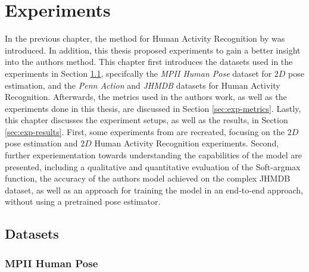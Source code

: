 \chapter{Experiments}

In the previous chapter, the method for Human Activity Recognition by \cite{luvizon_2d/3d_2018} was introduced.
In addition, this thesis proposed experiments to gain a better insight into the authors method.
This chapter first introduces the datasets used in the experiments in Section \ref{sec:exp-datasets}, specifcally the \textit{MPII Human Pose} dataset for $2D$ pose estimation, and the \textit{Penn Action} and \textit{JHMDB} datasets for Human Activity Recognition.
Afterwards, the metrics used in the authors work, as well as the experiments done in this thesis, are discussed in Section \ref{sec:exp-metrics}.
Lastly, this chapter discusses the experiment setups, as well as the results, in Section \ref{sec:exp-results}.
First, some experiments from \cite{luvizon_2d/3d_2018} are recreated, focusing on the $2D$ pose estimation and $2D$ Human Activity Recognition experiments.
Second, further experiementation towards understanding the capabilities of the model are presented, including a qualitative and quantitative evaluation of the Soft-argmax function, the accuracy of the authors model achieved on the complex JHMDB dataset, as well as an approach for training the model in an end-to-end approach, without using a pretrained pose estimator.

\section{Datasets}
\label{sec:exp-datasets}

\subsection{MPII Human Pose}
\label{sec:exp-mpii}


